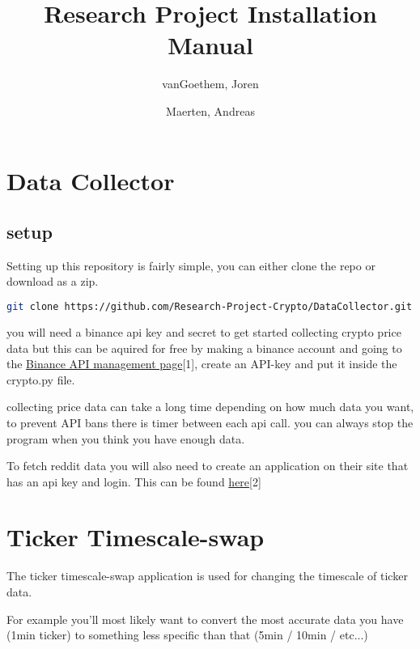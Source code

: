 \documentclass[12pt,a4paper]{article}
\begin{document}
\begin{titlepage}
    \author{
        vanGoethem, Joren
        \and
        Maerten, Andreas
    }
    \title{Research Project Installation Manual}
\end{titlepage}

\maketitle
\newpage
\tableofcontents
\newpage


\section{Data Collector}

\subsection{setup}
Setting up this repository is fairly simple, you can either clone the repo or download as a zip.

\begin{lstlisting}[language=bash]
git clone https://github.com/Research-Project-Crypto/DataCollector.git 
\end{lstlisting}

you will need a binance api key and secret to get started collecting crypto price data but this can be aquired for free by making a binance account and going to the \href{https://www.binance.com/en/my/settings/api-management}{Binance API management page}[1], create an API-key and put it inside the crypto.py file.

collecting price data can take a long time depending on how much data you want, to prevent API bans there is timer between each api call. you can always stop the program when you think you have enough data.

To fetch reddit data you will also need to create an application on their site that has an api key and login. This can be found \href{https://www.reddit.com/prefs/apps}{here}[2]

\section{Ticker Timescale-swap}

The ticker timescale-swap application is used for changing the timescale of ticker data.

For example you'll most likely want to convert the most accurate data you have (1min ticker) to something less specific than that (5min / 10min / etc...)
\end{document}
